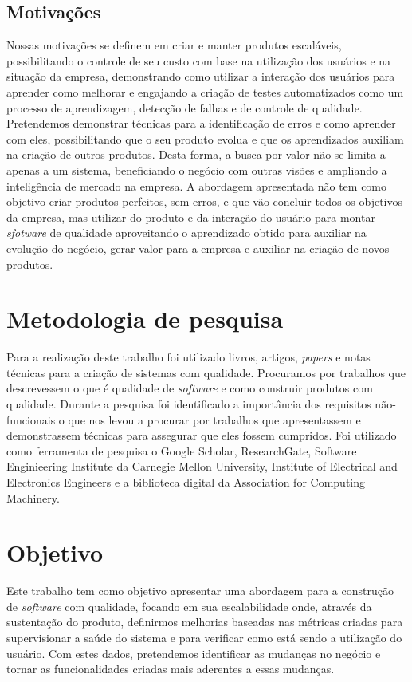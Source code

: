     \section{Motivações}
      Nossas motivações se definem em criar e manter produtos escaláveis,
      possibilitando o controle de seu custo com base na utilização
      dos usuários e na situação da empresa, demonstrando como utilizar a interação
      dos usuários para aprender como melhorar e engajando a criação de testes
      automatizados como um processo de aprendizagem, detecção de falhas e de
      controle de qualidade. \newline
      Pretendemos demonstrar técnicas para a identificação de erros e como
      aprender com eles, possibilitando que o seu produto evolua e que os
      aprendizados auxiliam na criação de outros produtos. Desta forma, a busca
      por valor não se limita a apenas a um sistema, beneficiando o negócio com
      outras visões e ampliando a inteligência de mercado na empresa. A abordagem
      apresentada não tem como objetivo criar produtos perfeitos, sem erros, e
      que vão concluir todos os objetivos da empresa, mas utilizar do produto e da
      interação do usuário para montar \textit{sfotware} de qualidade aproveitando
      o aprendizado obtido para auxiliar na evolução do negócio, gerar valor para
      a empresa e auxiliar na criação de novos produtos.

  \chapter{Metodologia de pesquisa}
    Para a realização deste trabalho foi utilizado livros, artigos, \textit{papers}
    e notas técnicas para a criação de sistemas com qualidade. Procuramos por trabalhos
    que descrevessem o que é qualidade de \textit{software} e como construir
    produtos com qualidade. Durante a pesquisa foi identificado a importância dos
    requisitos não-funcionais o que nos levou a procurar por trabalhos que
    apresentassem e demonstrassem técnicas para assegurar que eles fossem
    cumpridos. \newline
    Foi utilizado como ferramenta de pesquisa o Google Scholar, ResearchGate,
    Software Enginieering Institute da Carnegie Mellon University, Institute of
    Electrical and Electronics Engineers e a biblioteca digital da Association
    for Computing Machinery.

  \chapter{Objetivo}
    Este trabalho tem como objetivo apresentar uma abordagem para a construção de
    \textit{software} com qualidade, focando em sua escalabilidade onde, através
    da sustentação do produto, definirmos melhorias baseadas nas métricas criadas
    para supervisionar a saúde do sistema e para verificar como está sendo a
    utilização do usuário. Com estes dados, pretendemos identificar as mudanças
    no negócio e tornar as funcionalidades criadas mais aderentes a essas mudanças.
